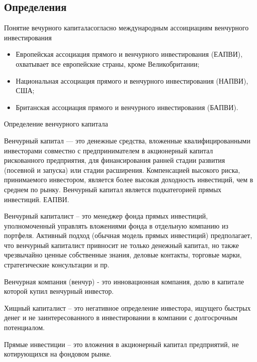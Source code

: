 \documentclass[_Venture_p1.tex]{subfiles}
\begin{document}

\subsection{Определения}
\begin{frame}{Понятие вечурного капитала}{согласно международным ассоициациям венчурного инвестирования}
\begin{itemize}
	\item Европейская ассоциация прямого и венчурного инвестирования (ЕАПВИ), охватывает все европейские страны, кроме Великобритании; 
	\item Национальная ассоциация прямого и венчурного инвестирования (НАПВИ), США;
	\item Британская ассоциация прямого и венчурного инвестирования (БАПВИ). 
\end{itemize}
\end{frame}
\begin{frame}[allowframebreaks]{Определение венчурного капитала}
\begin{block}{Венчурный капитал }
\quad
— это денежные средства, вложенные квалифицированными инвесторами совместно с предпринимателем в акционерный капитал рискованного предприятия, для финансирования ранней стадии развития (посевной и запуска) или стадии расширения. Компенсацией высокого риска, принимаемого инвестором, является более высокая доходность инвестиций, чем в среднем по рынку. Венчурный капитал является подкатегорией прямых инвестиций. ЕАПВИ.
\end{block}

\pagebreak

\begin{block}{Венчурный капиталист}
	\quad
	– это менеджер фонда прямых инвестиций, уполномоченный управлять вложениями фонда в отдельную компанию из портфеля. Активный подход (обычная модель прямых инвестиций) предполагает, что венчурный капиталист привносит не только денежный капитал, но также чрезвычайно ценные собственные знания, деловые контакты, торговые марки, стратегические консультации и пр.
\end{block}
\pagebreak

\begin{block}{Венчурная компания (венчур)}
	\quad 
	- это инновационная компания, долю в капитале которой купил венчурный инвестор.
\end{block}


\begin{block}{Хищный капиталист }
	\quad
	– это негативное определение инвестора, ищущего быстрых денег и не заинтересованного в инвестировании в компании с долгосрочным потенциалом.
\end{block}

\pagebreak

\begin{block}{Прямые инвестиции  }
	\quad
	– это вложения в акционерный капитал предприятий, не котирующихся на фондовом рынке.
\end{block}
\end{frame}
\end{document}
